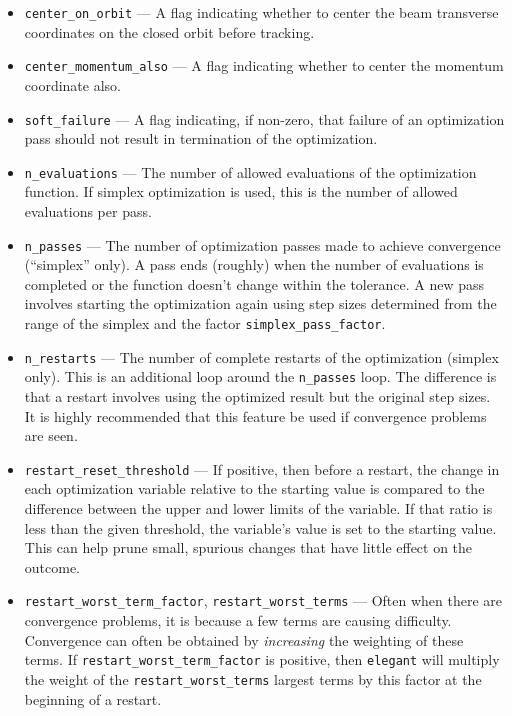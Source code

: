 \documentclass[11pt]{article}
\begin{document}
\begin{itemize}
\item \verb|center_on_orbit| --- A flag indicating whether to center the beam transverse coordinates on the closed orbit
  before tracking.

\item \verb|center_momentum_also| --- A flag indicating whether to center the momentum coordinate also.

\item \verb|soft_failure| --- A flag indicating, if non-zero, that failure of an optimization pass should not
result in termination of the optimization.

\item \verb|n_evaluations| --- The number of allowed evaluations of
the optimization function.  If simplex optimization is used, this is
the number of allowed evaluations per pass.

\item \verb|n_passes| --- The number of optimization passes made to
achieve convergence (``simplex'' only).  A pass ends (roughly) when
the number of evaluations is completed or the function doesn't change
within the tolerance.  A new pass involves starting the optimization
again using step sizes determined from the range of the simplex and
the factor \verb|simplex_pass_factor|.

\item \verb|n_restarts| --- The number of complete restarts of the
optimization (simplex only).  This is an additional loop around the
\verb|n_passes| loop.  The difference is that a restart involves using
the optimized result but the original step sizes.  It is highly
recommended that this feature be used if convergence problems are seen.

\item \verb|restart_reset_threshold| --- If positive, then before a restart,
  the change in each optimization variable relative to the starting value
  is compared to the difference between the upper and lower limits of the variable.
  If that ratio is less than the given threshold, the variable's value is set
  to the starting value. This can help prune small, spurious changes that
  have little effect on the outcome.

\item \verb|restart_worst_term_factor|, \verb|restart_worst_terms| --- Often
when there are convergence problems, it is because a few terms are causing 
difficulty.  Convergence can often be obtained by {\em increasing} the weighting
of these terms.  If  \verb|restart_worst_term_factor| is positive, then \verb|elegant|
will multiply the weight of the \verb|restart_worst_terms| largest terms by this
factor at the beginning of a restart.


\end{itemize}
\end{document}
